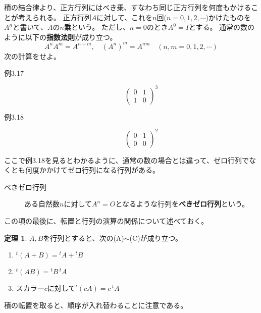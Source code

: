 \documentclass[10pt]{jsarticle}
\theoremstyle{definition}%
\newtheorem{thm}{定理}[section]%
\newcommand{\kakko}[1]{\left(#1 \right)} %
\numberwithin{equation}{section}%
\begin{document}
積の結合律より、正方行列にはべき乗、すなわち同じ正方行列を何度もかけることが考えられる。
正方行列$A$に対して、これを$n$回($n=0,1,2,\cdots$)かけたものを$A^{n}$と書いて、$A$の{\bf $n$乗}という。
ただし、$n=0$のとき$A^{0}=I$とする。
通常の数のように以下の{\bf 指数法則}が成り立つ。
\begin{equation}
  A^{n}A^{m}=A^{n+m},\quad (A^{n})^{m}=A^{nm} \quad(n,m=0,1,2,\cdots )
\end{equation}
次の計算をせよ。
\begin{description}
  \item[例3.17] 
  \begin{equation}
  \kakko{\begin{matrix}
    0&1\\
    1&0
  \end{matrix} }^{3}
  \end{equation}
  \item[例3.18]   \begin{equation}\kakko{\begin{matrix}
    0&1\\
    0&0
  \end{matrix}}^{2}
\end{equation}
\end{description}
ここで例3.18を見るとわかるように、通常の数の場合とは違って、ゼロ行列でなくとも何度かかけてゼロ行列になる行列がある。
\begin{framed}
  \begin{description}
    \item[べきゼロ行列] ある自然数$n$に対して$A^{n}=O$となるような行列を{\bf べきゼロ行列}という。
  \end{description}
  \end{framed}
この項の最後に、転置と行列の演算の関係について述べておく。
\begin{screen}
  \begin{thm}
    $A,B$を行列とすると、次の(A)$\sim$(C)が成り立つ。
    \begin{enumerate}
      \item ${}^{t}(A+B)={}^{t}A+{}^{t}B$ 
      \item ${}^{t}(AB)={}^{t}B\,{}^{t}A$
      \item スカラー$c$に対して${}^{t}(cA)=c\,{}^{t}A$
    \end{enumerate}
  \end{thm}
\end{screen}
積の転置を取ると、順序が入れ替わることに注意である。
\end{document}
